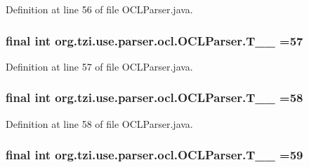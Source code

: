 Definition at line 56 of file O\-C\-L\-Parser.\-java.

\hypertarget{classorg_1_1tzi_1_1use_1_1parser_1_1ocl_1_1_o_c_l_parser_a86eebee1cea5509a93012fa3a7a7d62e}{
\subsubsection[{T\-\_\-\-\_\-57}]{\setlength{\rightskip}{0pt plus 5cm}final int org.\-tzi.\-use.\-parser.\-ocl.\-O\-C\-L\-Parser.\-T\-\_\-\-\_ =57\hspace{0.3cm}{\ttfamily [static]}}}\label{classorg_1_1tzi_1_1use_1_1parser_1_1ocl_1_1_o_c_l_parser_a86eebee1cea5509a93012fa3a7a7d62e}


Definition at line 57 of file O\-C\-L\-Parser.\-java.

\hypertarget{classorg_1_1tzi_1_1use_1_1parser_1_1ocl_1_1_o_c_l_parser_a26ca52aafdf8212e2491ad5e050b863c}{
\subsubsection[{T\-\_\-\-\_\-58}]{\setlength{\rightskip}{0pt plus 5cm}final int org.\-tzi.\-use.\-parser.\-ocl.\-O\-C\-L\-Parser.\-T\-\_\-\-\_ =58\hspace{0.3cm}{\ttfamily [static]}}}\label{classorg_1_1tzi_1_1use_1_1parser_1_1ocl_1_1_o_c_l_parser_a26ca52aafdf8212e2491ad5e050b863c}


Definition at line 58 of file O\-C\-L\-Parser.\-java.

\hypertarget{classorg_1_1tzi_1_1use_1_1parser_1_1ocl_1_1_o_c_l_parser_a505e8f6c889dd11adbf0d57465d018b2}{
\subsubsection[{T\-\_\-\-\_\-59}]{\setlength{\rightskip}{0pt plus 5cm}final int org.\-tzi.\-use.\-parser.\-ocl.\-O\-C\-L\-Parser.\-T\-\_\-\-\_ =59\hspace{0.3cm}{\ttfamily [static]}}}\label{classorg_1_1tzi_1_1use_1_1parser_1_1ocl_1_1_o_c_l_parser_a505e8f6c889dd11adbf0d57465d018b2}


